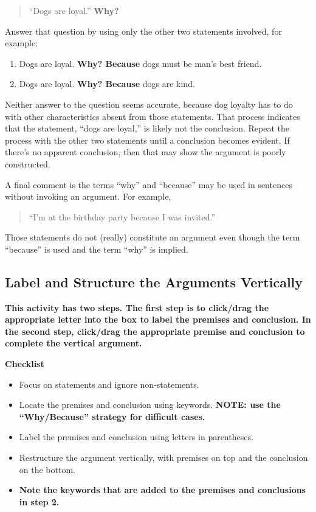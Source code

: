 \documentclass[
]{book}
\providecommand{\tightlist}{%
  \setlength{\itemsep}{0pt}\setlength{\parskip}{0pt}}
\begin{document}
\begin{reflect}
\begin{quote}
``Dogs are loyal.'' \textbf{Why?}
\end{quote}

Answer that question by using only the other two statements involved, for example:

\begin{enumerate}
\def\labelenumi{\arabic{enumi}.}
\tightlist
\item
  Dogs are loyal. \textbf{Why? Because} dogs must be man's best friend.
\item
  Dogs are loyal. \textbf{Why? Because} dogs are kind.
\end{enumerate}

Neither answer to the question seems accurate, because dog loyalty has to do with other characteristics absent from those statements. That process indicates that the statement, ``dogs are loyal,'' is likely not the conclusion. Repeat the process with the other two statements until a conclusion becomes evident. If there's no apparent conclusion, then that may show the argument is poorly constructed.

A final comment is the terms ``why'' and ``because'' may be used in sentences without invoking an argument. For example,

\begin{quote}
``I'm at the birthday party because I was invited.''
\end{quote}

Those statements do not (really) constitute an argument even though the term ``because'' is used and the term ``why'' is implied.

\hypertarget{label-and-structure-the-arguments-vertically}{%
\subsection*{Label and Structure the Arguments Vertically}\label{label-and-structure-the-arguments-vertically}}

\textbf{This activity has two steps. The first step is to click/drag the appropriate letter into the box to label the premises and conclusion. In the second step, click/drag the appropriate premise and conclusion to complete the vertical argument.}

\textbf{Checklist}

\begin{itemize}
\tightlist
\item
  Focus on statements and ignore non-statements.
\item
  Locate the premises and conclusion using keywords. \textbf{NOTE: use the ``Why/Because'' strategy for difficult cases.}
\item
  Label the premises and conclusion using letters in parentheses.
\item
  Restructure the argument vertically, with premises on top and the conclusion on the bottom.
\item
  \textbf{Note the keywords that are added to the premises and conclusions in step 2.}
\end{itemize}


\end{reflect}
\end{document}
